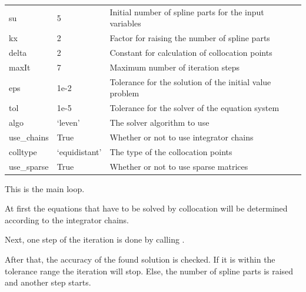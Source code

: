 \documentclass[letterpaper,10pt,english]{sphinxmanual}
\begin{document}
\begin{fulllineitems}
\begin{fulllineitems}
\begin{tabulary}{\linewidth}{|L|L|L|}
su
 & 
5
 & 
Initial number of spline parts for the input variables
\\

kx
 & 
2
 & 
Factor for raising the number of spline parts
\\

delta
 & 
2
 & 
Constant for calculation of collocation points
\\

maxIt
 & 
7
 & 
Maximum number of iteration steps
\\

eps
 & 
1e-2
 & 
Tolerance for the solution of the initial value problem
\\

tol
 & 
1e-5
 & 
Tolerance for the solver of the equation system
\\

algo
 & 
`leven'
 & 
The solver algorithm to use
\\

use\_chains
 & 
True
 & 
Whether or not to use integrator chains
\\

colltype
 & 
`equidistant'
 & 
The type of the collocation points
\\

use\_sparse
 & 
True
 & 
Whether or not to use sparse matrices
\\
\hline\end{tabulary}


\end{fulllineitems}


\begin{fulllineitems}
\label{pytrajectory:pytrajectory.trajectory.Trajectory.startIteration}
This is the main loop.

At first the equations that have to be solved by collocation will be
determined according to the integrator chains.

Next, one step of the iteration is done by calling {\hyperref[pytrajectory:pytrajectory.trajectory.Trajectory.iterate]{}}.

After that, the accuracy of the found solution is checked.
If it is within the tolerance range the iteration will stop.
Else, the number of spline parts is raised and another step starts.

\end{fulllineitems}


\end{fulllineitems}
\end{document}
